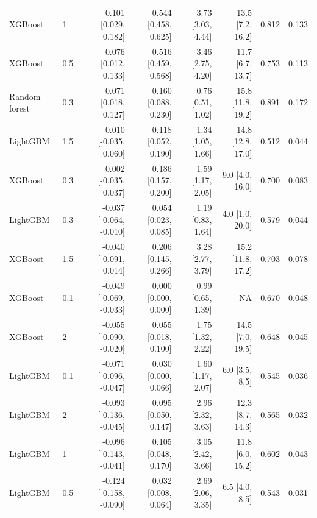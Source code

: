\begin{table}[!htbp]
\begin{tabular}{llrrrrrr}
XGBoost & 1 & 0.101 [0.029, 0.182] & 0.544 [0.458, 0.625] & 3.73 [3.03, 4.44] & 13.5 [7.2, 16.2] & 0.812 & 0.133 \\
XGBoost & 0.5 & 0.076 [0.012, 0.133] & 0.516 [0.459, 0.568] & 3.46 [2.75, 4.20] & 11.7 [6.7, 13.7] & 0.753 & 0.113 \\
Random forest & 0.3 & 0.071 [0.018, 0.127] & 0.160 [0.088, 0.230] & 0.76 [0.51, 1.02] & 15.8 [11.8, 19.2] & 0.891 & 0.172 \\
LightGBM & 1.5 & 0.010 [-0.035, 0.060] & 0.118 [0.052, 0.190] & 1.34 [1.05, 1.66] & 14.8 [12.8, 17.0] & 0.512 & 0.044 \\
XGBoost & 0.3 & 0.002 [-0.035, 0.037] & 0.186 [0.157, 0.200] & 1.59 [1.17, 2.05] & 9.0 [4.0, 16.0] & 0.700 & 0.083 \\
LightGBM & 0.3 & -0.037 [-0.064, -0.010] & 0.054 [0.023, 0.085] & 1.19 [0.83, 1.64] & 4.0 [1.0, 20.0] & 0.579 & 0.044 \\
XGBoost & 1.5 & -0.040 [-0.091, 0.014] & 0.206 [0.145, 0.266] & 3.28 [2.77, 3.79] & 15.2 [11.8, 17.2] & 0.703 & 0.078 \\
XGBoost & 0.1 & -0.049 [-0.069, -0.033] & 0.000 [0.000, 0.000] & 0.99 [0.65, 1.39] & NA & 0.670 & 0.048 \\
XGBoost & 2 & -0.055 [-0.090, -0.020] & 0.055 [0.018, 0.100] & 1.75 [1.32, 2.22] & 14.5 [7.0, 19.5] & 0.648 & 0.045 \\
LightGBM & 0.1 & -0.071 [-0.096, -0.047] & 0.030 [0.000, 0.066] & 1.60 [1.17, 2.07] & 6.0 [3.5, 8.5] & 0.545 & 0.036 \\
LightGBM & 2 & -0.093 [-0.136, -0.045] & 0.095 [0.050, 0.147] & 2.96 [2.32, 3.63] & 12.3 [8.7, 14.3] & 0.565 & 0.032 \\
LightGBM & 1 & -0.096 [-0.143, -0.041] & 0.105 [0.048, 0.170] & 3.05 [2.42, 3.66] & 11.8 [6.0, 15.2] & 0.602 & 0.043 \\
LightGBM & 0.5 & -0.124 [-0.158, -0.090] & 0.032 [0.008, 0.064] & 2.69 [2.06, 3.35] & 6.5 [4.0, 8.5] & 0.543 & 0.031 \\
\bottomrule
\end{tabular}
\end{table}
